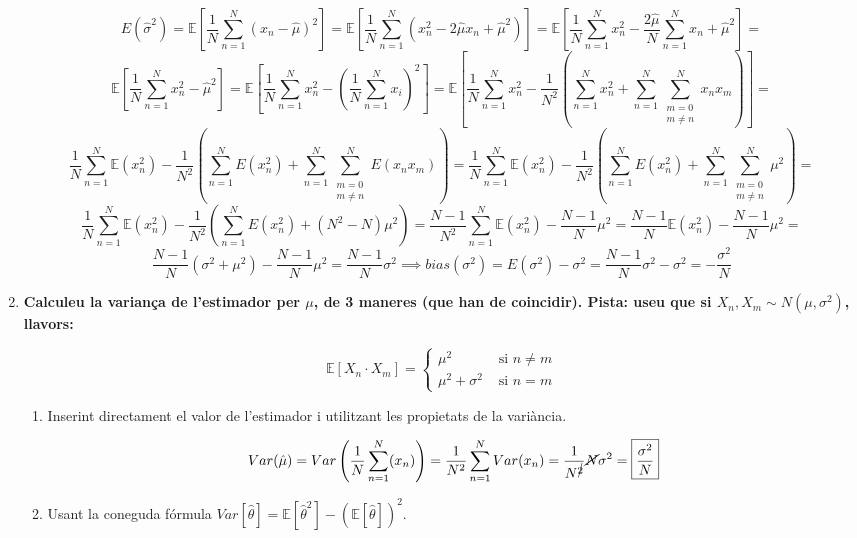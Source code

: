 \documentclass[a4paper]{article}
\begin{document}
\begin{enumerate}
$$E(\hat{\sigma}^2) =  \mathbb{E}\left[ \frac{1}{N}\sum_{n=1}^N (x_n - \hat{\mu})^2\right]
= \mathbb{E}\left[ \frac{1}{N}\sum_{n=1}^N \left(x_n^2 - 2\hat{\mu}x_n + \hat{\mu}^2\right)\right] 
= \mathbb{E}\left[ \frac{1}{N}\sum_{n=1}^N x_n^2 - \frac{2\hat{\mu}}{N}\sum_{n=1}^N x_n + \hat{\mu}^2\right] = $$ 
$$\mathbb{E}\left[ \frac{1}{N}\sum_{n=1}^N x_n^2 -  \hat{\mu}^2\right]
= \mathbb{E}\left[ \frac{1}{N}\sum_{n=1}^N x_n^2 - \left(\frac{1}{N}\sum_{n=1}^N x_i\right)^2 \right]
= \mathbb{E}\left[ \frac{1}{N}\sum_{n=1}^N x_n^2 - \frac{1}{N^2}\left( \sum_{n=1}^{N} x_n^2 + \sum_{n=1}^{N}\sum_{\substack{m = 0 \\ m \neq n}}^{N}x_n x_m\right) \right] = $$
$$
 \frac{1}{N}\sum_{n=1}^N \mathbb{E}(x_n^2) - \frac{1}{N^2}\left( \sum_{n=1}^{N}E(x_n^2) + \sum_{n=1}^{N}\sum_{\substack{m = 0 \\ m \neq n}}^{N}E(x_n x_m)\right) 
 =\frac{1}{N}\sum_{n=1}^N \mathbb{E}(x_n^2) - \frac{1}{N^2}\left( \sum_{n=1}^{N}E(x_n^2) + \sum_{n=1}^{N}\sum_{\substack{m = 0 \\ m \neq n}}^{N}\mu^2\right) = $$
$$
\frac{1}{N}\sum_{n=1}^N \mathbb{E}(x_n^2) - \frac{1}{N^2}\left( \sum_{n=1}^{N}E(x_n^2) + (N^2 - N)\mu^2\right)
=\frac{N-1}{N^2}\sum_{n=1}^N \mathbb{E}(x_n^2) - \frac{N-1}{N}\mu^2
=\frac{N-1}{N} \mathbb{E}(x_n^2) - \frac{N-1}{N}\mu^2 =$$
$$
\frac{N-1}{N}(\sigma^2 + \mu^2) - \frac{N-1}{N}\mu^2
= \boxed{\frac{N - 1}{N}\sigma^2} \implies bias(\sigma^2) = E(\sigma^2) - \sigma^2 = \frac{N-1}{N}\sigma^2 - \sigma^2 = \boxed{-\frac{\sigma ^2}{N}}
$$

\item \textbf{Calculeu la variança de l'estimador per $\mu$, de 3 maneres (que han de coincidir). Pista: useu que si $X_n, X_m \sim N(\mu, \sigma^2)$, llavors:}

$$ \mathbb{E}[X_n · X_m] = 
\begin{cases}
\mu^2 & \text{ si } n \ne m \\
\mu^2 + \sigma^2 & \text{ si } n = m
\end{cases}$$

\begin{enumerate}
    \item Inserint directament el valor de l'estimador i utilitzant les propietats de la variància.
    
    $$ Var(\hat{\mu}) = Var\left(\frac{1}{N} \sum_{n=1}^{N}(x_n)\right) = \frac{1}{N^2} \sum_{n=1}^{N}Var(x_n) = \frac{1}{N^{\cancel{2}}}\cancel{N}\sigma^2 = \boxed{\frac{\sigma^2}{N}}    $$
    
    \item Usant la coneguda fórmula $Var[\hat{\theta}] = \mathbb{E}[\hat{\theta}^2] - (\mathbb{E}[\hat{\theta}])^2$.
    

\end{enumerate}
\end{enumerate}
\end{document}
